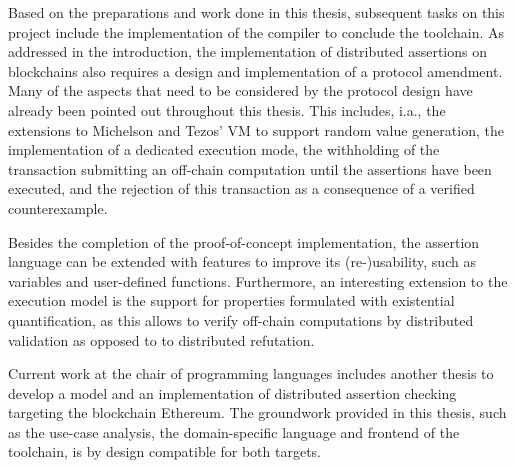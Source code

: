 Based on the preparations and work done in this thesis, subsequent tasks on this project include the implementation of the compiler to conclude the toolchain. As addressed in the introduction, the implementation of distributed assertions on blockchains also requires a design and implementation of a protocol amendment. Many of the aspects that need to be considered by the protocol design have already been pointed out throughout this thesis. This includes, i.a., the extensions to Michelson and Tezos' VM to support random value generation, the implementation of a dedicated execution mode, the withholding of the transaction submitting an off-chain computation until the assertions have been executed, and the rejection of this transaction as a consequence of a verified counterexample. 

Besides the completion of the proof-of-concept implementation, the assertion language can be extended with features to improve its (re-)usability, such as variables and user-defined functions. Furthermore, an interesting extension to the execution model is the support for properties formulated with existential quantification, as this allows to verify off-chain computations by distributed validation as opposed to to distributed refutation. 

Current work at the chair of programming languages includes another thesis to develop a model and an implementation of distributed assertion checking targeting the blockchain Ethereum. The groundwork provided in this thesis, such as the use-case analysis, the domain-specific language and frontend of the toolchain, is by design compatible for both targets. 